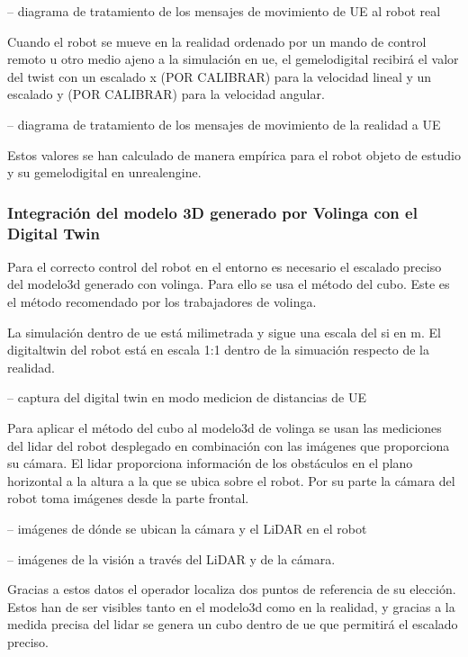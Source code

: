 \documentclass[a4paper, 12pt, spanish, twoside]{article}
\begin{document}
-- diagrama de tratamiento de los mensajes de movimiento de UE al robot real 

Cuando el robot se mueve en la realidad ordenado por un mando de control remoto u otro medio ajeno a la simulación en \acrshort{ue}, el \gls{gemelodigital} recibirá el valor del \gls{twist} con un escalado x (POR CALIBRAR) para la velocidad lineal y un escalado y (POR CALIBRAR) para la velocidad angular. 

-- diagrama de tratamiento de los mensajes de movimiento de la realidad a UE 

Estos valores se han calculado de manera empírica para el robot objeto de estudio y su \gls{gemelodigital} en \gls{unrealengine}. 

\subsubsection{Integración del modelo 3D generado por Volinga con el Digital Twin} \label{sec:implementacion:nerfstudio-volinga:integracion}

Para el correcto control del robot en el entorno es necesario el escalado preciso del \gls{modelo3d} generado con \gls{volinga}. Para ello se usa el método del cubo. Este es el método recomendado por los trabajadores de \gls{volinga}. 

La simulación dentro de \acrshort{ue} está milimetrada y sigue una escala del \acrshort{si} en \acrshort{m}. El \gls{digitaltwin} del robot está en escala 1:1 dentro de la simuación respecto de la realidad.  

-- captura del digital twin en modo medicion de distancias de UE 

Para aplicar el método del cubo al \gls{modelo3d} de \gls{volinga} se usan las mediciones del \acrshort{lidar} del robot desplegado en combinación con las imágenes que proporciona su cámara. El \acrshort{lidar} proporciona información de los obstáculos en el plano horizontal a la altura a la que se ubica sobre el robot. Por su parte la cámara del robot toma imágenes desde la parte frontal. 

-- imágenes de dónde se ubican la cámara y el LiDAR en el robot 

-- imágenes de la visión a través del LiDAR y de la cámara. 

Gracias a estos datos el operador localiza dos puntos de referencia de su elección. Estos han de ser visibles tanto en el \gls{modelo3d} como en la realidad, y gracias a la medida precisa del \acrshort{lidar} se genera un cubo dentro de \acrshort{ue} que permitirá el escalado preciso. 
\end{document}
